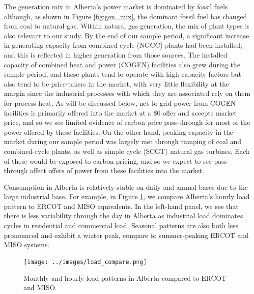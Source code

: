 \documentclass[12pt]{article}
\begin{document}
The generation mix in Alberta's power market is dominated by fossil fuels although, as shown in Figure \ref{fig:gen_mix}, the dominant fossil fuel has changed from coal to natural gas. Within natural gas generation, the mix of plant types is also relevant to our study. By the end of our sample period, a significant increase in generating capacity from combined cycle (NGCC) plants had been installed, and this is reflected in higher generation from those sources. The installed capacity of combined heat and power (COGEN) facilities also grew during the sample period, and these plants tend to operate with high capacity factors but also tend to be price-takers in the market, with very little flexibility at the margin since the industrial processes with which they are associated rely on them for process heat. As will be discussed below, net-to-grid power from COGEN facilities is primarily offered into the market at a \$0 offer and accepts market price, and so we see limited evidence of carbon price pass-through for most of the power offered by these facilities. On the other hand, peaking capacity in the market during our sample period was largely met through ramping of coal and combined-cycle plants, as well as simple cycle (SCGT) natural gas turbines. Each of these would be exposed to carbon pricing, and so we expect to see pass through affect offers of power from these facilities into the market.

Consumption in Alberta is relatively stable on daily and annual bases due to the large industrial base. For example, in Figure \ref{fig:load_pattern}, we compare Alberta's hourly load pattern to ERCOT and MISO equivalents. In the left-hand panel, we see that there is less variability through the day in Alberta as industrial load dominates cycles in residential and commercial load. Seasonal patterns are also both less pronounced and exhibit a winter peak, compare to summer-peaking ERCOT and MISO systems.

\begin{figure}[!h]%
	\centering \vspace{-.25cm} \texttt{[image: ../images/load\_compare.png]}
\vspace{-0.75cm}	\caption{Monthly and hourly load patterns in Alberta compared to ERCOT and MISO.}
\label{fig:load_pattern}
\end{figure}
\end{document}
